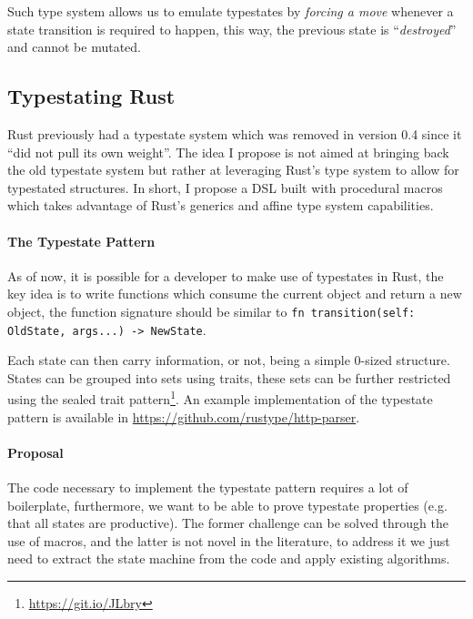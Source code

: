 \documentclass[a4paper, 10pt]{article}
\begin{document}
Such type system allows us to emulate typestates by \emph{forcing a move} whenever a state transition is required to happen,
this way, the previous state is “\emph{destroyed}” and cannot be mutated.

\subsection*{Typestating Rust}

Rust previously had a typestate system which was removed in version 0.4 since it “did not pull its own weight”.
The idea I propose is not aimed at bringing back the old typestate system but rather at leveraging Rust's type system to allow for typestated structures.
In short, I propose a DSL built with procedural macros which takes advantage of Rust's generics and affine type system capabilities.

\paragraph{The Typestate Pattern}

As of now, it is possible for a developer to make use of typestates in Rust,
the key idea is to write functions which consume the current object and return a new object,
the function signature should be similar to \texttt{fn transition(self: OldState, args...) -> NewState}.

Each state can then carry information, or not, being a simple 0-sized structure.
States can be grouped into sets using traits,
these sets can be further restricted using the sealed trait pattern\footnote{\url{https://git.io/JLbry}}.
An example implementation of the typestate pattern is available in \url{https://github.com/rustype/http-parser}.


\paragraph{Proposal}

The code necessary to implement the typestate pattern requires a lot of boilerplate,
furthermore, we want to be able to prove typestate properties (e.g. that all states are productive).
The former challenge can be solved through the use of macros,
and the latter is not novel in the literature,
to address it we just need to extract the state machine from the code and apply existing algorithms.
\end{document}
